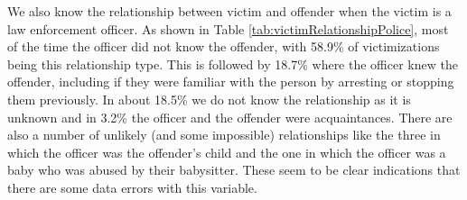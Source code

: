 \documentclass[
]{krantz}
\begin{document}
We also know the relationship between victim and offender
when the victim is a law enforcement officer. As shown in
Table \ref{tab:victimRelationshipPolice}, most of the time
the officer did not know the offender, with 58.9\% of
victimizations being this relationship type. This is
followed by 18.7\% where the officer knew the offender,
including if they were familiar with the person by arresting
or stopping them previously. In about 18.5\% we do not know
the relationship as it is unknown and in 3.2\% the officer
and the offender were acquaintances. There are also a number
of unlikely (and some impossible) relationships like the
three in which the officer was the offender's child and the
one in which the officer was a baby who was abused by their
babysitter. These seem to be clear indications that there
are some data errors with this variable.
\end{document}
